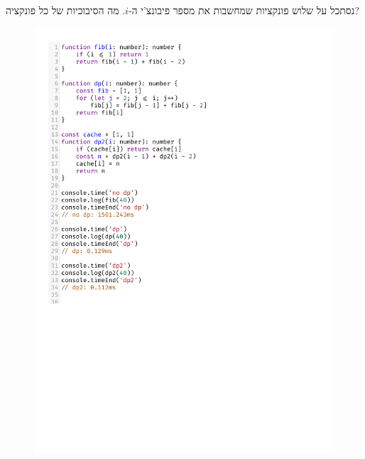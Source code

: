 נסתכל על שלוש פונקציות שמחשבות את מספר פיבונצ'י ה-$i$.
מה הסיבוכיות של כל פונקציה?
\begin{figure}
\includegraphics[width=\linewidth]{lec09/fib.pdf}
\end{figure}
